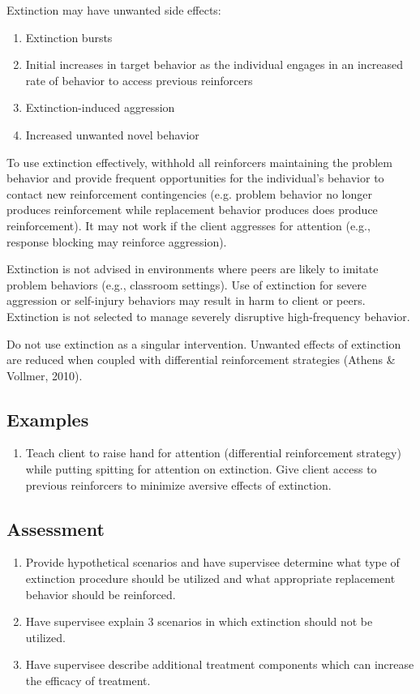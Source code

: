 Extinction may have unwanted side effects:
\begin{enumerate}
\item Extinction bursts
\item Initial increases in target behavior as the individual engages in an increased rate of behavior to access previous reinforcers
\item Extinction-induced aggression
\item Increased unwanted novel behavior
\end{enumerate}

To use extinction effectively, withhold all reinforcers maintaining the problem behavior and provide frequent opportunities for the individual's behavior to contact new reinforcement contingencies (e.g. problem behavior no longer produces reinforcement while replacement behavior produces does produce reinforcement). It may not work if the client aggresses for attention (e.g., response blocking may reinforce aggression).

Extinction is not advised in environments where peers are likely to imitate problem behaviors (e.g., classroom settings). Use of extinction for severe aggression or self-injury behaviors may result in harm to client or peers. Extinction is not selected to manage severely disruptive high-frequency behavior.

Do not use extinction as a singular intervention. Unwanted effects of extinction are reduced when coupled with differential reinforcement strategies (Athens \& Vollmer, 2010).
%
\subsection{Examples}
\begin{enumerate}
\item Teach client to raise hand for attention (differential reinforcement strategy) while putting spitting for attention on extinction. Give client access to previous reinforcers to minimize aversive effects of extinction.
\end{enumerate}
%
\subsection{Assessment}
\begin{enumerate}
\item Provide hypothetical scenarios and have supervisee determine what type of extinction procedure should be utilized and what appropriate replacement behavior should be reinforced. 
\item Have supervisee explain 3 scenarios in which extinction should not be utilized. 
\item Have supervisee describe additional treatment components which can increase the efficacy of treatment.
\end{enumerate}
%
